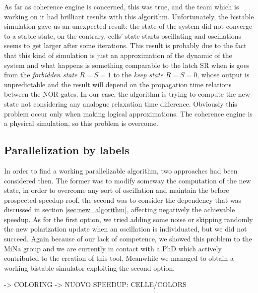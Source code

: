 As far as coherence engine is concerned, this was true, and the team which is working on it had brilliant results with this algorithm. Unfortunately, the bistable simulation gave us an unexpected result: the state of the system did not converge to a stable state, on the contrary, cells' state starts oscillating and oscillations seems to get larger after some iterations. This result is probably due to the fact that this kind of simulation is just an approximation of the dynamic of the system and what happens is something comparable to the latch SR when is goes from the \textit{forbidden state} $R=S=1$ to the \textit{keep state} $R=S=0$, whose output is unpredictable and the result will depend on the propagation time relations between the NOR gates. In our case, the algorithm is trying to compute the new state not considering any analogue relaxation time difference. Obviously this problem occur only when making logical approximations. The coherence engine is a physical simulation, so this problem is overcome.

\subsection{Parallelization by labels}
In order to find a working parallelizable algorithm, two approaches had been considered then. The former was to modify someway the computation of the new state, in order to overcome any sort of oscillation and maintain the before prospected speedup roof, the second was to consider the dependency that was discussed in section \ref{sec:new_algorithm}, affecting negatively the achievable speedup.
As for the first option, we tried adding some noise or skipping randomly the new polarization update when an oscillation is individuated, but we did not succeed. Again because of our lack of competence, we showed this problem to the MiNa group and we are currently in contact with a PhD which actively contributed to the creation of this tool. Meanwhile we managed to obtain a working bistable simulator exploiting the second option.\newline


-> COLORING
-> NUOVO SPEEDUP: CELLE/COLORS

